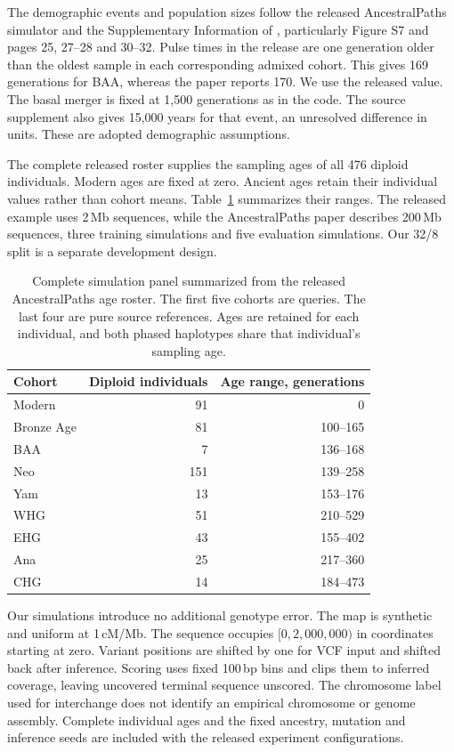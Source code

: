 \documentclass[letterpaper]{article}
\begin{document}
The demographic events and population sizes follow the released AncestralPaths simulator and the Supplementary Information of \citet{eurasians2024}, particularly Figure S7 and pages 25, 27--28 and 30--32. Pulse times in the release are one generation older than the oldest sample in each corresponding admixed cohort. This gives 169 generations for BAA, whereas the paper reports 170. We use the released value. The basal merger is fixed at 1,500 generations as in the code. The source supplement also gives 15,000 years for that event, an unresolved difference in units. These are adopted demographic assumptions.

The complete released roster supplies the sampling ages of all 476 diploid individuals. Modern ages are fixed at zero. Ancient ages retain their individual values rather than cohort means. Table~\ref{tab:age_roster} summarizes their ranges. The released example uses 2\,Mb sequences, while the AncestralPaths paper describes 200\,Mb sequences, three training simulations and five evaluation simulations. Our 32/8 split is a separate development design.

\begin{table}[!htbp]
\centering
\small
\begin{tabular}{@{}lrr@{}}
\toprule
Cohort & Diploid individuals & Age range, generations\\
\midrule
Modern &91&0\\
Bronze Age &81&100--165\\
BAA &7&136--168\\
Neo &151&139--258\\
Yam &13&153--176\\
WHG &51&210--529\\
EHG &43&155--402\\
Ana &25&217--360\\
CHG &14&184--473\\
\bottomrule
\end{tabular}
\caption{Complete simulation panel summarized from the released AncestralPaths age roster. The first five cohorts are queries. The last four are pure source references. Ages are retained for each individual, and both phased haplotypes share that individual's sampling age.}
\label{tab:age_roster}
\end{table}

Our simulations introduce no additional genotype error. The map is synthetic and uniform at 1\,cM/Mb. The sequence occupies $[0,2{,}000{,}000)$ in coordinates starting at zero. Variant positions are shifted by one for VCF input and shifted back after inference. Scoring uses fixed 100\,bp bins and clips them to inferred coverage, leaving uncovered terminal sequence unscored. The chromosome label used for interchange does not identify an empirical chromosome or genome assembly. Complete individual ages and the fixed ancestry, mutation and inference seeds are included with the released experiment configurations.
\end{document}
